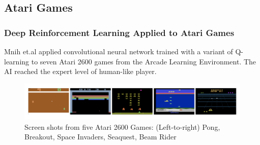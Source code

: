 \documentclass{beamer}
\begin{document}
\subsection{Atari Games}
\begin{frame}
  \frametitle{Deep Reinforcement Learning Applied to Atari Games}
  Mnih et.al \cite{7} applied convolutional neural network trained with a variant of Q-learning to seven Atari 2600 games from the Arcade Learning Environment. The AI reached the expert level of human-like player.
  \begin{figure}
    \includegraphics[width=1\linewidth]{figures/atari}
    \caption{  Screen shots from five Atari 2600 Games: (Left-to-right) Pong, Breakout, Space Invaders, Seaquest, Beam Rider}
  \end{figure}
\end{frame}
\end{document}
